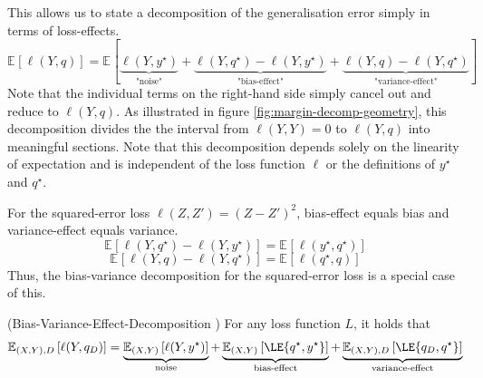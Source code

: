 \documentclass[
	twoside=false, %
]{kaobook}
\begin{document}
This allows us to state a decomposition of the generalisation error simply in terms of loss-effects.
$$
\mathbb{E}_{}\left[ \ell(Y,q) \right]  = \mathbb{E}_{}\left[  \underbrace{ \ell(Y, y^\star) }_{\text{"noise"} }
+
\underbrace{ \ell(Y, q^\star) - \ell(Y, y^\star) }_{\text{"bias-effect"} }
+ 
\underbrace{ \ell(Y, q) - \ell(Y, q^\star) }_{\text{"variance-effect"} } \right]
$$
Note that the individual terms on the right-hand side simply cancel out and reduce to $\ell(Y, q)$. As illustrated in figure \ref{fig:margin-decomp-geometry}, this decomposition divides the the interval from $\ell(Y, Y) = 0$ to $\ell(Y, q)$ into meaningful sections. 
Note that this decomposition depends solely on the linearity of expectation and is independent of the loss function $\ell$ or the definitions of $y^\star$ and $q^\star$.

For the squared-error loss $\ell(Z, Z') = (Z - Z')^2$, bias-effect equals bias and variance-effect equals variance.
$$
 \mathbb{E}_{}\left[ \ell(Y, q^\star) - \ell(Y, y^\star) \right]  = \mathbb{E}_{}\left[ \ell(y^\star, q^\star) \right]
$$
$$
 \mathbb{E}_{}\left[ \ell(Y,q) - \ell(Y, q^\star) \right]  = \mathbb{E}_{}\left[ \ell(q^\star, q)  \right] 
$$
Thus, the bias-variance decomposition for the squared-error loss is a special case of this.

\begin{theorem} (Bias-Variance-Effect-Decomposition \cite{james_GeneralizationsBiasVariance_})
\label{thm:bias-variance-effect}
For any loss function $L$, it holds that
\begin{align*}
\mathbb{E}_{(X,Y), D}\left[ \ell(Y, q_{D}) \right]  
&= 
\underbrace{\mathbb{E}_{(X,Y)}\left[ \ell(Y, y^\star) \right]  }_{\text{noise}}
+ \underbrace{\mathbb{E}_{(X,Y)}\left[ \LE{q^\star, y^\star} \right] }_{\text{bias-effect}}
+ \underbrace{\mathbb{E}_{(X,Y),D}\left[ \LE{q_D, q^\star} \right] }_{\text{variance-effect}}  \\
\end{align*}
\end{theorem}
\end{document}
